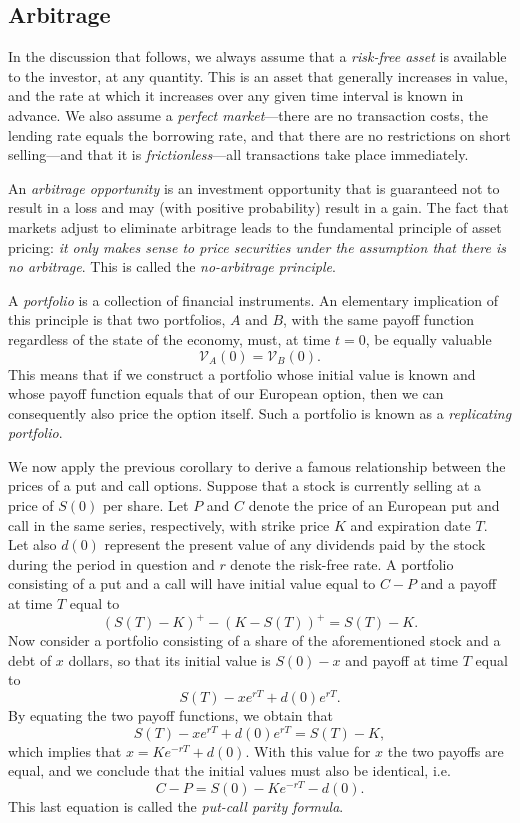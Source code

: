 \documentclass[]{article}
\theoremstyle{definition}
\theoremstyle{remark}
\begin{document}
\subsection{Arbitrage}
In the discussion that follows, we always assume that a \textit{risk-free asset} is available to the investor, at any quantity. This is an asset that generally increases in value, and the rate at which it increases over any given time interval is known in advance. We also assume a \textit{perfect market}---there are no transaction costs, the lending rate equals the borrowing rate, and that there are no restrictions on short selling---and that it is \textit{frictionless}---all transactions take place immediately.
\par
An \textit{arbitrage opportunity} is an investment opportunity that is guaranteed not to result in a loss and may (with positive probability) result in a gain. The fact that markets adjust to eliminate arbitrage leads to the fundamental principle of asset pricing: \textit{it only makes sense to price securities under the assumption that there is no arbitrage}. This is called the \textit{no-arbitrage principle}.
\par 
A \textit{portfolio} is a collection of financial instruments. An elementary implication of this principle is that two portfolios, $A$ and $B$, with the same payoff function regardless of the state of the economy, must, at time $t=0$, be equally valuable~\cite{roman2013introduction}
\[\mathcal{V}_{A}(0) = \mathcal{V}_B (0). \]
This means that if we construct a portfolio whose initial value is known and whose payoff function equals that of our European option, then we can consequently also price the option itself. Such a portfolio is known as a \textit{replicating portfolio}.
\par We now apply the previous corollary to derive a famous relationship between the prices of a put and call options. Suppose that a stock is currently selling at a price of $S(0)$ per share. Let $P$ and $C$ denote the price of an European put and call in the same series, respectively, with strike price $K$ and expiration date $T$. Let also $d(0)$ represent the present value of any dividends paid by the stock during the period in question and $r$ denote the risk-free rate. A portfolio consisting of a put and a call will have initial value equal to $C-P$ and a payoff at time $T$ equal to
\[(S(T) - K)^+ -(K-S(T))^+ = S(T)-K.\]
Now consider a portfolio consisting of a share of the aforementioned stock and a debt of $x$ dollars, so that its initial value is $S(0)-x$ and payoff at time $T$ equal to
\[  S(T) - x e^{rT} +d(0) e^{r T}. \]
By equating the two payoff functions, we obtain that
\[
S(T) - x e^{rT} +d(0) e^{r T} = S(T) - K,
\]
which implies that $x=K e^{-rT} + d(0)$. With this value for $x$ the two payoffs are equal, and we conclude that the initial values must also be identical, i.e.
\[ C-P = S(0) - Ke^{-rT} - d(0). \]
This last equation is called the \textit{put-call parity formula}.
\end{document}
